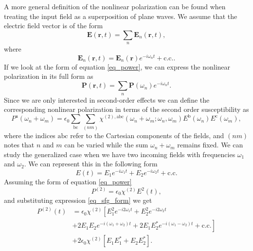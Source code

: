A more general definition of the nonlinear polarization can be found when
treating the input field as a superposition of plane waves. We assume that the
electric field vector is of the form
\begin{equation}
\mathbf{E}(\mathbf{r},t) = \sum_{n}\mathbf{E}_{n}(\mathbf{r},t),
\end{equation}
where
\begin{equation}
\mathbf{E}_{n}(\mathbf{r},t)
= \mathbf{E}_{n}(\mathbf{r})e^{-i\omega_{n}t} + \text{c.c.}.
\end{equation}
If we look at the form of equation \eqref{eq_power}, we can express the
nonlinear polarization in its full form as
\begin{equation}
\mathbf{P}(\mathbf{r},t) = \sum_{n}\mathbf{P}(\omega_{n})e^{-i\omega_{n}t}.
\end{equation}
Since we are only interested in second-order effects we can define the
corresponding nonlinear polarization in terms of the second order susceptibility
as
\begin{equation}
P^{\mathrm{a}}(\omega_{n} + \omega_{m})
= \epsilon_{0}\sum_{\mathrm{bc}}\sum_{(nm)}
\chi^{(2),\mathrm{abc}}(\omega_{n}+\omega_{m};\omega_{n},\omega_{m})
E^{\mathrm{b}}(\omega_{n})E^{\mathrm{c}}(\omega_{m}),\label{eq_nonlin_p}
\end{equation}
where the indices $\mathrm{abc}$ refer to the Cartesian components of the
fields, and $(nm)$ notes that $n$ and $m$ can be varied while the sum
$\omega_{n} + \omega_{m}$ remains fixed. We can study the generalized case when
we have two incoming fields with frequencies $\omega_{1}$ and $\omega_{2}$. We
can represent this in the following form
\begin{equation}
E(t) = E_{1}e^{-i\omega_{1}t} + E_{2}e^{-i\omega_{2}t}
     + \text{c.c.}\label{eq_sfg_form}
\end{equation}
Assuming the form of equation \eqref{eq_power}
\begin{equation}
P^{(2)} = \epsilon_{0}\chi^{(2)}E^{2}(t),
\end{equation}
and substituting expression \eqref{eq_sfg_form} we get
\begin{align}
P^{(2)}(t)
&= \epsilon_{0}\chi^{(2)}\left[E^{2}_{1}e^{-i2\omega_{1}t}
 + E^{2}_{2}e^{-i2\omega_{2}t}\right.\nonumber\\
&+ \left. 2E_{1}E_{2}e^{-i(\omega_{1}+\omega_{2})t}
 + 2E_{1}E^{\ast}_{2}e^{-i(\omega_{1}-\omega_{2})t}
 + \text{c.c.}\right]\nonumber\\
&+ 2\epsilon_{0}\chi^{(2)}\left[E_{1}E^{\ast}_{1}
 + E_{2}E^{\ast}_{2}\right].\label{eq_second_order}
\end{align}
